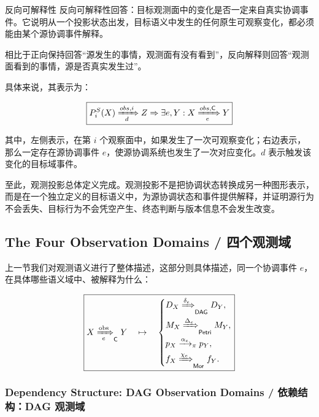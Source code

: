 \begin{MWCallout}[MWCyan]{反向可解释性}
  反向可解释性回答：目标观测面中的变化是否一定来自真实协调事件。它说明从一个投影状态出发，目标语义中发生的任何原生可观察变化，都必须能由某个源协调事件解释。

  相比于正向保持回答“源发生的事情，观测面有没有看到”，反向解释则回答“观测面看到的事情，源是否真实发生过”。

  具体来说，其表示为：

  \begin{equation}
    \boxed{P_i^S(X) \xRightarrow[d]{obs,i} Z \Rightarrow \exists e,Y: X\xRightarrow[e]{obs,\mathsf C}Y
    }
    \label{eq:projection-backward-reflection}
  \end{equation}

  其中，左侧表示，在第 $i$ 个观察面中，如果发生了一次可观察变化；右边表示，那么一定存在源协调事件 $e$，使源协调系统也发生了一次对应变化。$d$ 表示触发该变化的目标域事件。
\end{MWCallout}

至此，观测投影总体定义完成。观测投影不是把协调状态转换成另一种图形表示，而是在一个独立定义的目标语义中，为源协调状态和事件提供解释，并证明源行为不会丢失、目标行为不会凭空产生、终态判断与版本信息不会发生改变。

\subsection{The Four Observation Domains /
四个观测域}

上一节我们对观测语义进行了整体描述，这部分则具体描述，同一个协调事件 $e$，在具体哪些语义域中、被解释为什么：

\begin{equation}
  \boxed{
    X\xRightarrow[e]{\mathrm{obs}}_{\mathsf C}Y
    \quad\mapsto\quad
    \left\{
      \begin{aligned}
        &D_X\xRightarrow{\delta_e}_{\mathsf{DAG}}D_Y,\\
        &M_X\xRightarrow{\Delta_e}_{\mathsf{Petri}}M_Y,\\
        &p_X\xrightarrow{\alpha_e}_{\pi}p_Y,\\
        &f_X\xRightarrow{\chi_e}_{\mathsf{Mor}}f_Y.
      \end{aligned}
      \right.
    }
    \label{eq:four-observation-domain-event-mapping}
  \end{equation}

  \subsubsection{Dependency Structure: DAG Observation Domains / 依赖结构：DAG 观测域}

